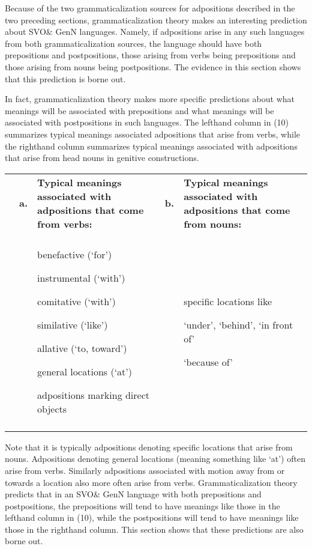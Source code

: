 \documentclass[output=paper]{langsci/langscibook}
\begin{document}
Because of the two grammaticalization sources for adpositions described in the two preceding sections, grammaticalization theory makes an interesting prediction about SVO\& GenN languages. Namely, if adpositions arise in any such languages from both grammaticalization sources, the language should have both prepositions and postpositions, those arising from verbs being prepositions and those arising from nouns being postpositions. The evidence in this section shows that this prediction is borne out.

In fact, grammaticalization theory makes more specific predictions about what meanings will be associated with prepositions and what meanings will be associated with postpositions in such languages. The lefthand column in (10) summarizes typical meanings associated adpositions that arise from verbs, while the righthand column summarizes typical meanings associated with adpositions that arise from head nouns in genitive constructions.

\begin{table}
\begin{tabularx}{\textwidth}{XXXXX}
\lsptoprule
& \bfseries a. & \bfseries Typical meanings associated with  adpositions that come from verbs: & \bfseries b. & \bfseries Typical meanings associated with adpositions that come from nouns:\\
&  &  &  & \\
&  & {benefactive (‘for’)}

{instrumental (‘with’)}

{comitative (‘with’)}

{similative (‘like’)}

{allative (‘to, toward’)}

{general locations (‘at’)}

adpositions marking direct objects &  & {specific locations like}

{‘under’, ‘behind’, ‘in front of’}

‘because of’\\
\lspbottomrule
\end{tabularx}
\end{table}

Note that it is typically adpositions denoting specific locations that arise from nouns. Adpositions denoting general locations (meaning something like ‘at’) often arise from verbs. Similarly adpositions associated with motion away from or towards a location also more often arise from verbs. Grammaticalization theory predicts that in an SVO\& GenN language with both prepositions and postpositions, the prepositions will tend to have meanings like those in the lefthand column in (10), while the postpositions will tend to have meanings like those in the righthand column. This section shows that these predictions are also borne out.
\end{document}
